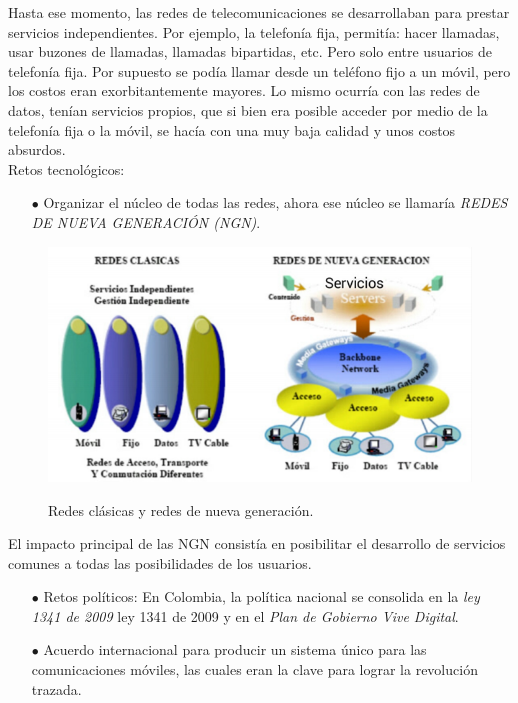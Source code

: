 Hasta ese momento, las redes de telecomunicaciones se desarrollaban para prestar servicios independientes. Por ejemplo, la telefonía fija, permitía: hacer llamadas, usar buzones de llamadas, llamadas bipartidas, etc. Pero solo entre usuarios de telefonía fija. Por supuesto se podía llamar desde un teléfono fijo a un móvil, pero los costos eran exorbitantemente mayores. Lo mismo ocurría con las redes de datos, tenían servicios propios, que si bien era posible acceder por medio de la telefonía fija o la móvil, se hacía con una muy baja calidad y unos costos absurdos. \\

Retos tecnológicos: \\

\begin{itemize}
	\item [$\bullet$] Organizar el núcleo de todas las redes, ahora ese núcleo se llamaría  \textit{REDES DE NUEVA GENERACIÓN (NGN)}.
\end{itemize}

\begin{figure}[h!]
	\captionsetup{justification = raggedright, singlelinecheck = false}
	\caption{Redes clásicas y redes de nueva generación.} 
	\centering
	\includegraphics[scale=1]{Imagenes/Redes-retos.png}
	\label{fig:Redes-retos}
\end{figure}

El impacto principal de las NGN consistía en posibilitar el desarrollo de servicios comunes a todas las posibilidades de los usuarios.


\begin{itemize}
	\item [$\bullet$] Retos políticos: En Colombia, la política nacional se consolida en la \textit{ley 1341 de 2009} ley 1341 de 2009 y en el \textit{ Plan de Gobierno Vive Digital}.
	\item [$\bullet$] Acuerdo internacional para producir un sistema único para las comunicaciones móviles, las cuales eran la clave para lograr la revolución trazada.
\end{itemize}

